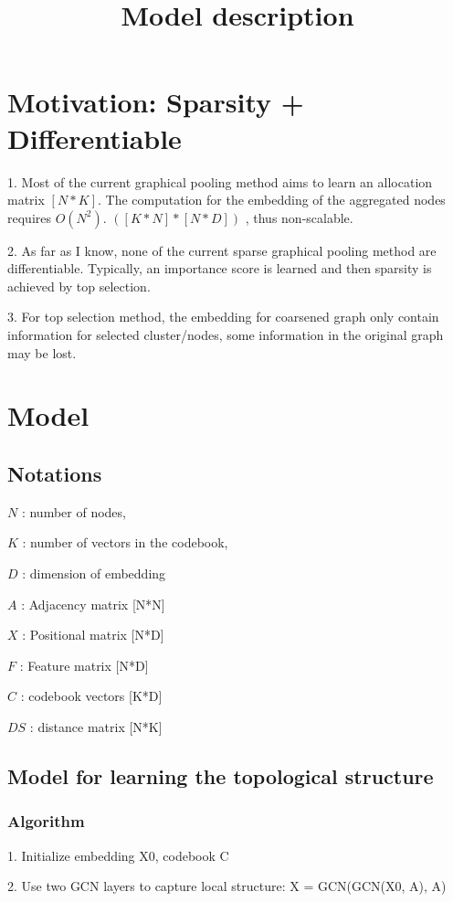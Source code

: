 \documentclass[12pt]{amsart}
\title{Model description}
\author{}
\begin{document}
\maketitle
\section{Motivation: Sparsity + Differentiable}
1.
Most of the current graphical pooling method aims to learn an allocation matrix $[N*K]$. 
The computation for the embedding of the aggregated nodes requires $O(N^2)$. $([K*N] * [N*D])$
, thus non-scalable.

2.
As far as I know, none of the current sparse graphical pooling method are differentiable.
Typically, an importance score is learned and then sparsity is achieved by top selection.

3.
For top selection method, the embedding for coarsened graph only contain information for selected cluster/nodes,
some information in the original graph may be lost.


\section{Model}
\subsection{Notations} 
\hfill

$N$ : number of nodes, 

$K$ : number of vectors in the codebook,

$D$ : dimension of embedding

$A$ : Adjacency matrix [N*N]

$X$ : Positional matrix [N*D]

$F$ : Feature matrix [N*D]

$C$ : codebook vectors [K*D]

$DS$ : distance matrix [N*K]


\subsection{Model for learning the topological structure}
\subsubsection{Algorithm}
\hfill

1. Initialize embedding X0, codebook C

2. Use two GCN layers to capture local structure: X = GCN(GCN(X0, A), A)
\end{document}
